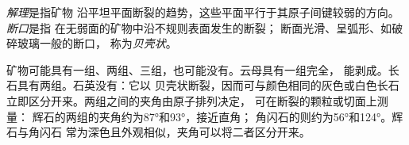 \begin{definition}[解理；断口]\label{def:g11:minerals:cleavage}
\emph{解理}是指矿物
沿平坦平面断裂的趋势，这些平面平行于其原子间键较弱的方向。
\emph{断口}是指
在无弱面的矿物中沿不规则表面发生的断裂；
断面光滑、呈弧形、如破碎玻璃一般的断口，
称为\emph{贝壳状}。
\end{definition}

矿物可能具有一组、两组、三组，也可能没有。云母具有一组完全，
能剥成。长石具有两组。石英没有：它以
贝壳状断裂，因而可与颜色相同的灰色或白色长石
立即区分开来。两组之间的夹角由原子排列决定，
可在断裂的颗粒或切面上测量：
辉石的两组的夹角约为\ang{87}和\ang{93}，接近直角；
角闪石的则约为\ang{56}和\ang{124}。辉石与角闪石
常为深色且外观相似，夹角可以将二者区分开来。

